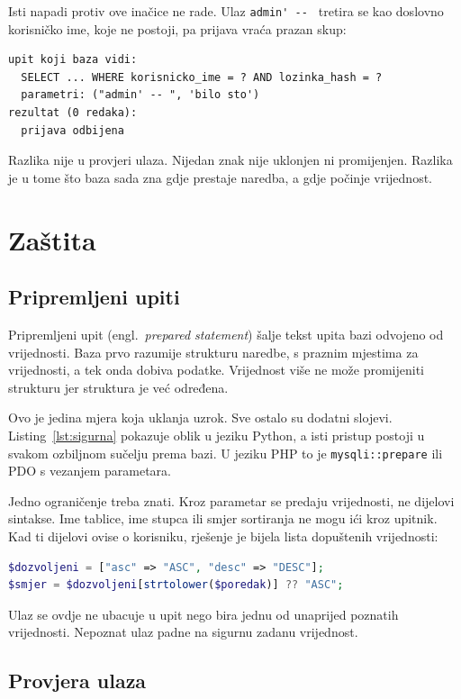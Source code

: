 \documentclass{mathos}
\begin{document}
\noindent
Isti napadi protiv ove inačice ne rade. Ulaz \verb|admin' -- | tretira se kao doslovno korisničko ime, koje ne postoji, pa prijava vraća prazan skup:

\begin{lstlisting}[basicstyle=\ttfamily\scriptsize]
upit koji baza vidi:
  SELECT ... WHERE korisnicko_ime = ? AND lozinka_hash = ?
  parametri: ("admin' -- ", 'bilo sto')
rezultat (0 redaka):
  prijava odbijena
\end{lstlisting}

\noindent
Razlika nije u provjeri ulaza. Nijedan znak nije uklonjen ni promijenjen. Razlika je u tome što baza sada zna gdje prestaje naredba, a gdje počinje vrijednost.


\chapter{Zaštita}\label{obrana}

\section{Pripremljeni upiti}

Pripremljeni upit (engl.\ \emph{prepared statement}) šalje tekst upita bazi odvojeno od vrijednosti. Baza prvo razumije strukturu naredbe, s praznim mjestima za vrijednosti, a tek onda dobiva podatke. Vrijednost više ne može promijeniti strukturu jer struktura je već određena.

Ovo je jedina mjera koja uklanja uzrok. Sve ostalo su dodatni slojevi. Listing~\ref{lst:sigurna} pokazuje oblik u jeziku Python, a isti pristup postoji u svakom ozbiljnom sučelju prema bazi. U jeziku PHP to je \verb|mysqli::prepare| ili PDO s vezanjem parametara.

Jedno ograničenje treba znati. Kroz parametar se predaju vrijednosti, ne dijelovi sintakse. Ime tablice, ime stupca ili smjer sortiranja ne mogu ići kroz upitnik. Kad ti dijelovi ovise o korisniku, rješenje je bijela lista dopuštenih vrijednosti:

\begin{lstlisting}[language=PHP]
$dozvoljeni = ["asc" => "ASC", "desc" => "DESC"];
$smjer = $dozvoljeni[strtolower($poredak)] ?? "ASC";
\end{lstlisting}

\noindent
Ulaz se ovdje ne ubacuje u upit nego bira jednu od unaprijed poznatih vrijednosti. Nepoznat ulaz padne na sigurnu zadanu vrijednost.

\section{Provjera ulaza}
\end{document}

